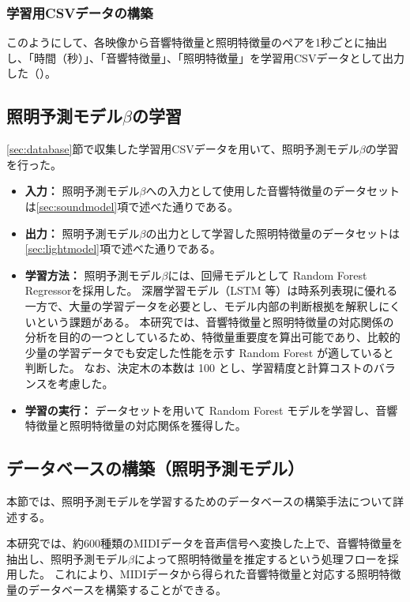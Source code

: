 \subsubsection{学習用CSVデータの構築} \label{sec:csvoutput}

このようにして、各映像から音響特徴量と照明特徴量のペアを1秒ごとに抽出し、「時間（秒）」、「音響特徴量」、「照明特徴量」を学習用CSVデータとして出力した（）。

\subsection{照明予測モデル$\beta$の学習} \label{sec:modelthink}

\ref{sec:database}節で収集した学習用CSVデータを用いて、照明予測モデル$\beta$の学習を行った。

\begin{itemize}
	\item \textbf{入力：}
        照明予測モデル$\beta$への入力として使用した音響特徴量のデータセットは\ref{sec:soundmodel}項で述べた通りである。
    \item \textbf{出力：}
        照明予測モデル$\beta$の出力として学習した照明特徴量のデータセットは\ref{sec:lightmodel}項で述べた通りである。
    \item \textbf{学習方法：}
        照明予測モデル$\beta$には、回帰モデルとして Random Forest Regressorを採用した。
        深層学習モデル（LSTM 等）は時系列表現に優れる一方で、大量の学習データを必要とし、モデル内部の判断根拠を解釈しにくいという課題がある。
        本研究では、音響特徴量と照明特徴量の対応関係の分析を目的の一つとしているため、特徴量重要度を算出可能であり、比較的少量の学習データでも安定した性能を示す Random Forest が適していると判断した。
        なお、決定木の本数は 100 とし、学習精度と計算コストのバランスを考慮した。
	\item \textbf{学習の実行：}
        データセットを用いて Random Forest モデルを学習し、音響特徴量と照明特徴量の対応関係を獲得した。
\end{itemize}

\subsection{データベースの構築（照明予測モデル）} \label{sec:midi}

本節では、照明予測モデルを学習するためのデータベースの構築手法について詳述する。

本研究では、約600種類のMIDIデータを音声信号へ変換した上で、音響特徴量を抽出し、照明予測モデル$\beta$によって照明特徴量を推定するという処理フローを採用した。
これにより、MIDIデータから得られた音響特徴量と対応する照明特徴量のデータベースを構築することができる。

